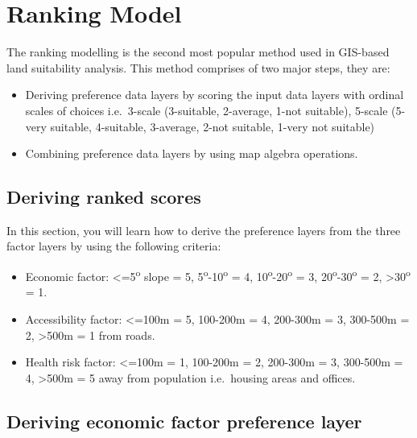 \documentclass[
  letterpaper,
  DIV=11,
  numbers=noendperiod]{scrreprt}
\providecommand{\tightlist}{%
  \setlength{\itemsep}{0pt}\setlength{\parskip}{0pt}}\usepackage{longtable,booktabs,array}
\begin{document}
\hypertarget{ranking-model}{%
\section{Ranking Model}\label{ranking-model}}

The ranking modelling is the second most popular method used in
GIS-based land suitability analysis. This method comprises of two major
steps, they are:

\begin{itemize}
\tightlist
\item
  Deriving preference data layers by scoring the input data layers with
  ordinal scales of choices i.e.~3-scale (3-suitable, 2-average, 1-not
  suitable), 5-scale (5-very suitable, 4-suitable, 3-average, 2-not
  suitable, 1-very not suitable)
\item
  Combining preference data layers by using map algebra operations.
\end{itemize}

\hypertarget{deriving-ranked-scores}{%
\subsection{Deriving ranked scores}\label{deriving-ranked-scores}}

In this section, you will learn how to derive the preference layers from
the three factor layers by using the following criteria:

\begin{itemize}
\tightlist
\item
  Economic factor: \textless=5\textsuperscript{o} slope = 5,
  5\textsuperscript{o}-10\textsuperscript{o} = 4,
  10\textsuperscript{o}-20\textsuperscript{o} = 3,
  20\textsuperscript{o}-30\textsuperscript{o} = 2,
  \textgreater30\textsuperscript{o} = 1.
\item
  Accessibility factor: \textless=100m = 5, 100-200m = 4, 200-300m = 3,
  300-500m = 2, \textgreater500m = 1 from roads.
\item
  Health risk factor: \textless=100m = 1, 100-200m = 2, 200-300m = 3,
  300-500m = 4, \textgreater500m = 5 away from population i.e.~housing
  areas and offices.
\end{itemize}

\hypertarget{deriving-economic-factor-preference-layer}{%
\subsection{Deriving economic factor preference
layer}\label{deriving-economic-factor-preference-layer}}
\end{document}
